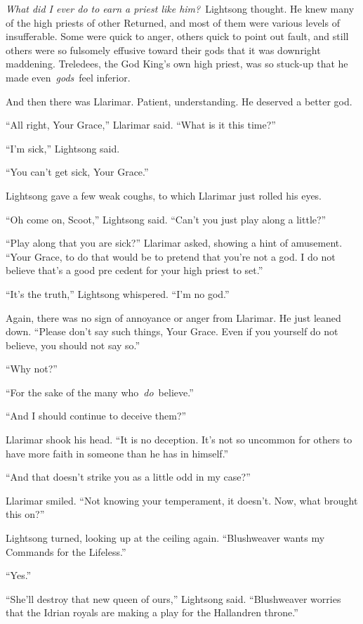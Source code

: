 \textit{What did I ever do to earn a priest like him?}~Lightsong thought. He knew many of the high priests of other Returned, and most of them were various levels of insufferable. Some were quick to anger, others quick to point out fault, and still others were so fulsomely effusive toward their gods that it was downright maddening. Treledees, the God King’s own high priest, was so stuck-up that he made even~\textit{gods}~feel inferior.

And then there was Llarimar. Patient, understanding. He deserved a better god.

“All right, Your Grace,” Llarimar said. “What is it this time?”

“I’m sick,” Lightsong said.

“You can’t get sick, Your Grace.”

Lightsong gave a few weak coughs, to which Llarimar just rolled his eyes.

“Oh come on, Scoot,” Lightsong said. “Can’t you just play along a little?”

“Play along that you are sick?” Llarimar asked, showing a hint of amusement. “Your Grace, to do that would be to pretend that you’re not a god. I do not believe that’s a good pre cedent for your high priest to set.”

“It’s the truth,” Lightsong whispered. “I’m no god.”

Again, there was no sign of annoyance or anger from Llarimar. He just leaned down. “Please don’t say such things, Your Grace. Even if you yourself do not believe, you should not say so.”

“Why not?”

“For the sake of the many who~\textit{do}~believe.”

“And I should continue to deceive them?”

Llarimar shook his head. “It is no deception. It’s not so uncommon for others to have more faith in someone than he has in himself.”

“And that doesn’t strike you as a little odd in my case?”

Llarimar smiled. “Not knowing your temperament, it doesn’t. Now, what brought this on?”

Lightsong turned, looking up at the ceiling again. “Blushweaver wants my Commands for the Lifeless.”

“Yes.”

“She’ll destroy that new queen of ours,” Lightsong said. “Blushweaver worries that the Idrian royals are making a play for the Hallandren throne.”

